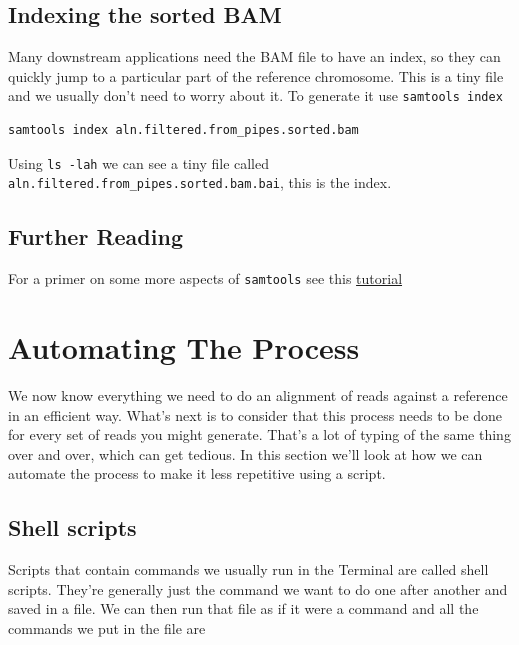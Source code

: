 \documentclass[]{book}
\begin{document}
\hypertarget{indexing-the-sorted-bam}{%
\section{Indexing the sorted BAM}\label{indexing-the-sorted-bam}}

Many downstream applications need the BAM file to have an index, so they can quickly jump to a particular part of the reference chromosome. This is a tiny file and we usually don't need to worry about it. To generate it use \texttt{samtools\ index}

\begin{verbatim}
samtools index aln.filtered.from_pipes.sorted.bam
\end{verbatim}

Using \texttt{ls\ -lah} we can see a tiny file called \texttt{aln.filtered.from\_pipes.sorted.bam.bai}, this is the index.

\hypertarget{further-reading-2}{%
\section{Further Reading}\label{further-reading-2}}

For a primer on some more aspects of \texttt{samtools} see this \href{http://quinlanlab.org/tutorials/samtools/samtools.html}{tutorial}

\hypertarget{automating-the-process}{%
\chapter{Automating The Process}\label{automating-the-process}}

We now know everything we need to do an alignment of reads against a reference in an efficient way. What's next is to consider that this process needs to be done for every set of reads you might generate. That's a lot of typing of the same thing over and over, which can get tedious. In this section we'll look at how we can automate the process to make it less repetitive using a script.

\hypertarget{shell-scripts}{%
\section{Shell scripts}\label{shell-scripts}}

Scripts that contain commands we usually run in the Terminal are called shell scripts. They're generally just the command we want to do one after another and saved in a file. We can then run that file as if it were a command and all the commands we put in the file are
\end{document}
